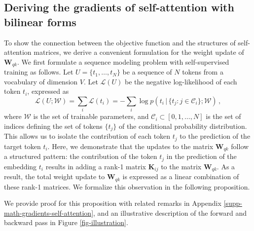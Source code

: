 \subsection{Deriving the gradients of self-attention with bilinear forms}
%

%
%
To show the connection between the objective function and the structures of self-attention matrices, we derive a convenient formulation for the weight update of $\bm{W}_{qk}$.
%
We first formulate a sequence modeling problem with self-supervised training as follows. 
%
Let $U = \{t_1, \dots, t_N\}$ be a  sequence of $N$ tokens from a vocabulary of dimension $V$.
%
Let $\mathcal{L}(U)$ be the negative log-likelihood of each token $t_i$, expressed as
%
\begin{equation}
    \mathcal{L}(U;\mathcal{W}) = \sum_i \mathcal{L}(t_i)=  - \sum_i \log p(t_i \,|\, \{t_j : j \in  \mathcal{C}_i\}; \mathcal{W}) \,,
\end{equation}
%
where $\mathcal{W}$ is the set of trainable parameters, and $\mathcal{C}_i \subset [0,1,\dots, N]$ is the set of indices defining the set of tokens $\{t_j\}$ of the conditional probability distribution.
%
This allows us to isolate the contribution of each token $t_j$ to the prediction of the target token $t_i$.
%
Here, we demonstrate that the updates to the matrix $\bm{W}_{qk}$ follow a structured pattern: the contribution of the token $t_j $ in the prediction of the embedding $t_i$ results in adding a rank-1 matrix $\bm{K}_{ij}$ to the matrix $\bm{W}_{qk}$.
%
As a result, the total weight update to $\bm{W}_{qk}$ is expressed as a linear combination of these rank-1 matrices.
%
We formalize this observation in the following proposition.
%

%

We provide proof for this proposition with related remarks in Appendix \ref{supp-math-gradients-self-attention}, and an illustrative description of the forward and backward pass in Figure \ref{fig-illustration}.
%




